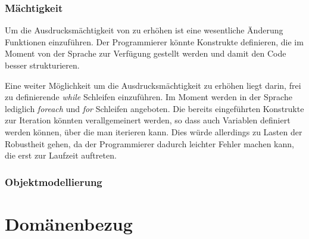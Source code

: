\subsubsection{Mächtigkeit} %
\label{ssub:machtigkeit}
Um die Ausdrucksmächtigkeit von \dg zu erhöhen ist eine wesentliche Änderung Funktionen einzuführen. Der Programmierer könnte Konstrukte definieren, die im Moment von der Sprache zur Verfügung gestellt werden und damit den Code besser strukturieren. 

Eine weiter Möglichkeit um die Ausdrucksmächtigkeit zu erhöhen liegt darin, frei zu definierende \emph{while} Schleifen einzuführen. Im Moment werden in der Sprache lediglich \emph{foreach} und \emph{for} Schleifen angeboten. Die bereits eingeführten Konstrukte zur Iteration könnten verallgemeinert werden, so dass auch Variablen definiert werden können, über die man iterieren kann. Dies würde allerdings zu Lasten der Robustheit gehen, da der Programmierer dadurch leichter Fehler machen kann, die erst zur Laufzeit auftreten.

\subsubsection{Objektmodellierung} %
\label{ssub:objektmodellierung}




\section{Domänenbezug} %
\label{sec:domanenbezug}

